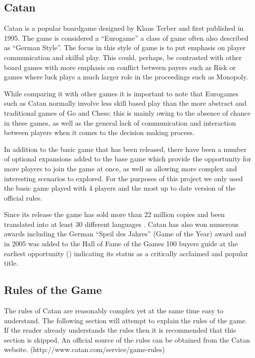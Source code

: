 \documentclass[]{article}
\begin{document}
\subsection{Catan}
Catan is a popular boardgame designed by Klaus Terber and first published in 1995. The game is considered a ``Eurogame'' a class of game often also described as ``German Style''. The focus in this style of game is to put emphasis on player communication and skilful play. This could, perhaps, be contrasted with other board games with more emphasis on conflict between payers such as Risk or games where luck plays a much larger role in the proceedings such as Monopoly. 

\par While comparing it with other games it is important to note that Eurogames such as Catan normally involve less skill based play than the more abstract and traditional games of Go and Chess; this is mainly owing to the absence of chance in these games, as well as the general lack of communication and interaction between players when it comes to the decision making process.

\par In addition to the basic game that has been released, there have been a number of optional expansions added to the base game which provide the opportunity for more players to join the game at once, as well as allowing more complex and interesting scenarios to explored. For the purposes of this project we only used the basic game played with 4 players and the most up to date version of the official rules.

\par Since its release the game has sold more than 22 million copies and been translated into at least 30 different languages \autocite{variety2015}. Catan has also won numerous awards including the German ``Speil des Jahres'' (Game of the Year) award and in 2005 was added to the Hall of Fame of the Games 100 buyers guide at the earliest opportunity (\citeauthor{spielDesJahr}) indicating its status as a critically acclaimed and popular title.

\subsection{Rules of the Game}
The rules of Catan are reasonably complex yet at the same time easy to understand. The following section will attempt to explain the rules of the game. If the reader already understands the rules then it is recommended that this section is skipped. An official source of the rules can be obtained from the Catan website. (http://www.catan.com/service/game-rules)
\end{document}
